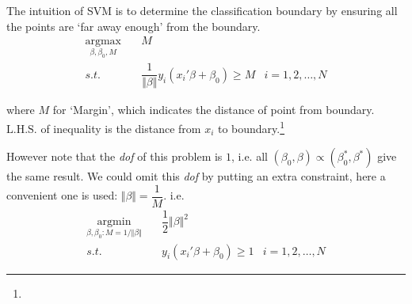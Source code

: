     The intuition of SVM is to determine the classification boundary by ensuring all the points are `far away enough' from the boundary.
\begin{equation*}
    \begin{aligned}
    \mathop{\arg\max}\limits_{\beta ,\beta _0,M}\quad &M\\
    s.t.\quad & \dfrac{1}{\Vert \beta  \Vert }y_i(x_i'\beta +\beta _0)\geq M&i=1,2,\ldots,N
    \end{aligned}
\end{equation*}

    where $ M $ for `Margin', which indicates the distance of point from boundary. $  \mathrm{L.H.S.} $ of inequality is the distance from $ x_i $ to boundary.\footnote{
    }

    However note that the \textit{dof} of this problem is $ 1 $, i.e. all $ (\beta_0,\beta) \propto (\beta _0^*,\beta ^*) $ give the same result. We could omit this \textit{dof} by putting an extra constraint, here a convenient one is used: $ \Vert \beta  \Vert =\dfrac{1}{M} $. i.e.
    \begin{equation*}
        \begin{aligned}
        \mathop{\arg\min}\limits_{\beta ,\beta _0:M=1/\Vert \beta  \Vert }\quad &\dfrac{1}{2}\Vert \beta  \Vert^2 \\
        s.t.\quad & y_i(x_i'\beta +\beta _0)\geq 1&i=1,2,\ldots,N
        \end{aligned}
    \end{equation*}

